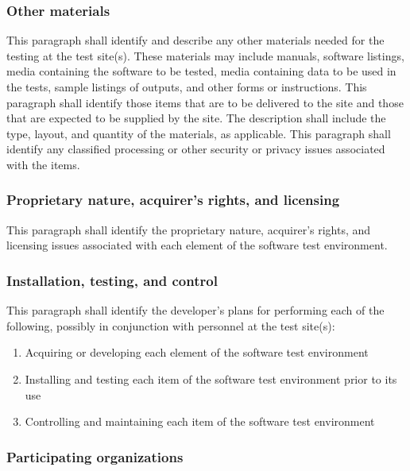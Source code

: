 \documentclass{fidata-report-template}
\begin{document}
\subsubsection{Other materials}

This paragraph shall identify and describe any other materials needed
for the testing at the test site(s). These materials may include
manuals, software listings, media containing the software to be tested,
media containing data to be used in the tests, sample listings of
outputs, and other forms or instructions. This paragraph shall identify
those items that are to be delivered to the site and those that are
expected to be supplied by the site. The description shall include the
type, layout, and quantity of the materials, as applicable. This
paragraph shall identify any classified processing or other security or
privacy issues associated with the items.

\subsubsection{Proprietary nature, acquirer's rights, and
licensing}

This paragraph shall identify the proprietary nature, acquirer's rights,
and licensing issues associated with each element of the software test
environment.

\subsubsection{Installation, testing, and control}

This paragraph shall identify the developer's plans for performing each
of the following, possibly in conjunction with personnel at the test
site(s):

\begin{enumerate}
\itemsep1pt\parskip0pt
\item
  Acquiring or developing each element of the software test environment
\item
  Installing and testing each item of the software test environment
  prior to its use
\item
  Controlling and maintaining each item of the software test environment
\end{enumerate}

\subsubsection{Participating organizations}
\end{document}
